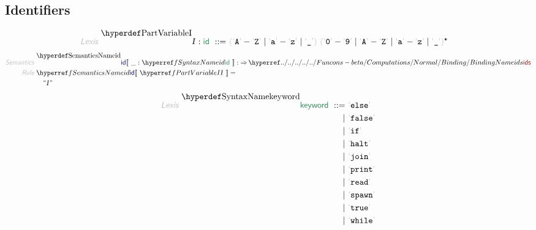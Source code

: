 \subsection*{Identifiers}\hypertarget{identifiers}{}\label{identifiers}

\begin{align*}
  \KEY{Lexis} ~ 
    \VARDECL{I} : \SYN{id}
      ~ ::= ~ & \LEFTGROUP \LEX{A} - \LEX{Z} \mid \LEX{a} - \LEX{z} \mid \LEX{\UNDERSCORE } \RIGHTGROUP ~ \LEFTGROUP \LEX{0} - \LEX{9} \mid \LEX{A} - \LEX{Z} \mid \LEX{a} - \LEX{z} \mid \LEX{\UNDERSCORE } \RIGHTGROUP\STAR
\end{align*}
\begin{align*}
  \KEY{Semantics} ~ 
  & \SEMDECL{id} \LEFTPHRASE ~ \_ : \SYNREF{id} ~ \RIGHTPHRASE  
    :  \TO \NAMEHYPER{../../../../../Funcons-beta/Computations/Normal}{Binding}{ids}
\\
  \KEY{Rule} ~ 
    & \SEMREF{id} \LEFTPHRASE ~ \VARREF{I} ~ \RIGHTPHRASE  = \\&\quad
      \textsf{\textquotedblleft}\VAR{I}\textsf{\textquotedblright}
\end{align*}
\begin{align*}
  \KEY{Lexis} ~ 
     \SYNDECL{keyword}
      ~ ::= ~ &
      \LEX{else} \\
      ~ \mid ~ &  \LEX{false} \\
      ~ \mid ~ &  \LEX{if} \\
      ~ \mid ~ &  \LEX{halt} \\
      ~ \mid ~ &  \LEX{join} \\
      ~ \mid ~ &  \LEX{print} \\
      ~ \mid ~ &  \LEX{read} \\
      ~ \mid ~ &  \LEX{spawn} \\
      ~ \mid ~ &  \LEX{true} \\
      ~ \mid ~ &  \LEX{while}
\end{align*}
